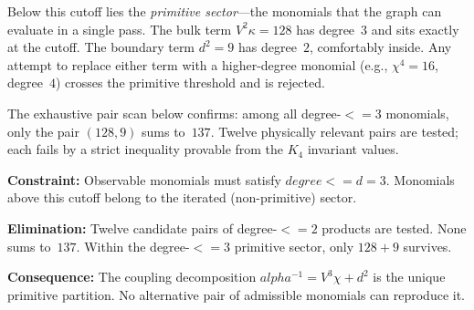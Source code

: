 \documentclass[11pt,a4paper]{book}
\def\alpha{alpha}%
\def\leq{<=}%
\def\text#1{#1}%
\begin{document}
Below this cutoff lies the \emph{primitive sector}---the monomials
that the graph can evaluate in a single pass.  The bulk term
$V^2 \kappa = 128$ has degree~$3$ and sits exactly at the cutoff.
The boundary term $d^2 = 9$ has degree~$2$, comfortably inside.
Any attempt to replace either term with a higher-degree monomial
(e.g., $\chi^4 = 16$, degree~$4$) crosses the primitive threshold
and is rejected.

The exhaustive pair scan below confirms: among all degree-$\leq 3$
monomials, only the pair $(128, 9)$ sums to~$137$.  Twelve physically
relevant pairs are tested; each fails by a strict inequality provable
from the $K_4$ invariant values.

\textbf{Constraint:}
Observable monomials must satisfy $\text{degree} \leq d = 3$.
Monomials above this cutoff belong to the iterated (non-primitive)
sector.

\textbf{Elimination:}
Twelve candidate pairs of degree-$\leq 2$ products are tested.
None sums to~$137$.  Within the degree-$\leq 3$ primitive sector,
only $128 + 9$ survives.

\textbf{Consequence:}
The coupling decomposition $\alpha^{-1} = V^3 \chi + d^2$ is the
unique primitive partition.  No alternative pair of admissible
monomials can reproduce it.
\end{document}
